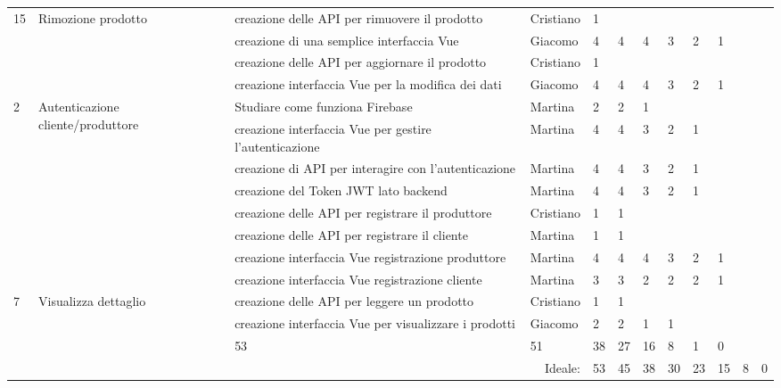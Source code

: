 \begin{longtable}{p{0.5cm}|p{2.7cm}|p{4.5cm}|p{1.7cm}|p{1.5cm}|p{0.2cm}|p{0.2cm}|p{0.2cm}|p{0.2cm}|p{0.2cm}|p{0.2cm}|p{0.2cm}}
    \multirow{3}{0.2cm}{15} & \multirow{3}{0.2cm}{Rimozione prodotto} 
    & creazione delle API per rimuovere il prodotto & Cristiano & 1 & & & & & & &\\
    && creazione di una semplice interfaccia Vue & Giacomo & 4&4 & 4&3 &2 &1 & &\\
    
    
    \hline
    \multirow{3}{0.2cm}{20} & \multirow{3}{0.2cm}{Aggiornamento prodotto} 
    & creazione delle API per aggiornare il prodotto & Cristiano & 1 & & & & & & &\\
    && creazione interfaccia Vue per la modifica dei dati  & Giacomo & 4&4 & 4&3 &2 &1 & &\\
    
    
    \hline
    
    \multirow{6}{0.2cm}{2} & \multirow{6}{0.2cm}{Autenticazione cliente/produttore } 
    & Studiare come funziona Firebase & Martina & 2&2 & 1& & & & &\\
    && creazione interfaccia Vue per gestire l'autenticazione & Martina & 4&4 & 3& 2& 1& & &\\
    && creazione di API per interagire con l'autenticazione & Martina & 4&4 & 3& 2& 1& & &\\
    && creazione del Token JWT lato backend  & Martina & 4&4 & 3& 2& 1& & &\\
    
    
    \hline
    
    \multirow{6}{0.2cm}{1} & \multirow{6}{0.2cm}{Registrazione cliente/produttore } 
    & creazione delle API per registrare il produttore & Cristiano & 1 & 1 & & & & & &\\
    && creazione delle API per registrare il cliente  & Martina & 1 & 1 & & & & & &\\
    && creazione interfaccia Vue registrazione produttore  & Martina & 4& 4 & 4& 3 &2 &1 & &\\
    && creazione interfaccia Vue registrazione cliente  & Martina & 3& 3 & 2& 2 &2 &1 & &\\
    
    \hline
    
    \multirow{3}{0.2cm}{7} & \multirow{3}{0.2cm}{Visualizza dettaglio} 
    & creazione delle API per leggere un prodotto & Cristiano & 1 & 1 & & & & & &\\
    && creazione interfaccia Vue per visualizzare i prodotti  & Giacomo & 2& 2 & 1& 1 & & & &\\
    
    
    
    
    \hline
    \hline
    \hline
    \multicolumn{4}{r|}{Totale: }& 53&51 &38 & 27&16&8&1&0\\
    \hline
    \multicolumn{4}{r|}{Ideale: }& 53&45 &38 & 30&23&15&8&0\\
    

\end{longtable}

